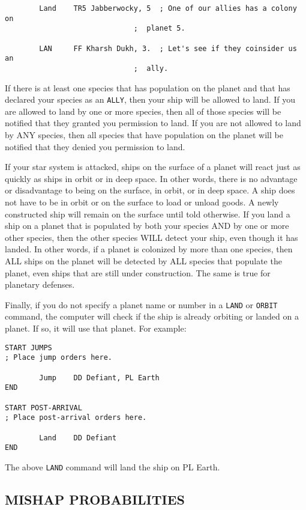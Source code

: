\documentclass[10pt,titlepage]{article}
\begin{document}
\begin{verbatim}
        Land    TR5 Jabberwocky, 5  ; One of our allies has a colony on
                              ;  planet 5.

        LAN     FF Kharsh Dukh, 3.  ; Let's see if they coinsider us an
                              ;  ally.
\end{verbatim} 

If there is at least one species that has population on the planet and that has
declared your species as an \texttt{ALLY}, then your ship will be allowed to land.  If
you are allowed to land by one or more species, then all of those species will
be notified that they granted you permission to land.  If you are not allowed
to land by ANY species, then all species that have population on the planet
will be notified that they denied you permission to land.

If your star system is attacked, ships on the surface of a planet will react
just as quickly as ships in orbit or in deep space.  In other words, there is
no advantage or disadvantage to being on the surface, in orbit, or in deep
space.  A ship does not have to be in orbit or on the surface to load or
unload goods.  A newly constructed ship will remain on the surface until told
otherwise.  If you land a ship on a planet that is populated by both your
species AND by one or more other species, then the other species WILL detect
your ship, even though it has landed.  In other words, if a planet is colonized
by more than one species, then ALL ships on the planet will be detected by ALL
species that populate the planet, even ships that are still under construction.
The same is true for planetary defenses.

Finally, if you do not specify a planet name or number in a \texttt{LAND} or \texttt{ORBIT}
command, the computer will check if the ship is already orbiting or landed
on a planet.  If so, it will use that planet.  For example:

\begin{verbatim}
START JUMPS
; Place jump orders here.

        Jump    DD Defiant, PL Earth
END

START POST-ARRIVAL
; Place post-arrival orders here.

        Land    DD Defiant
END
\end{verbatim} 

The above \texttt{LAND} command will land the ship on PL Earth.


\subsection{MISHAP PROBABILITIES}
\label{sec:mishapprobabilities}
\end{document}
